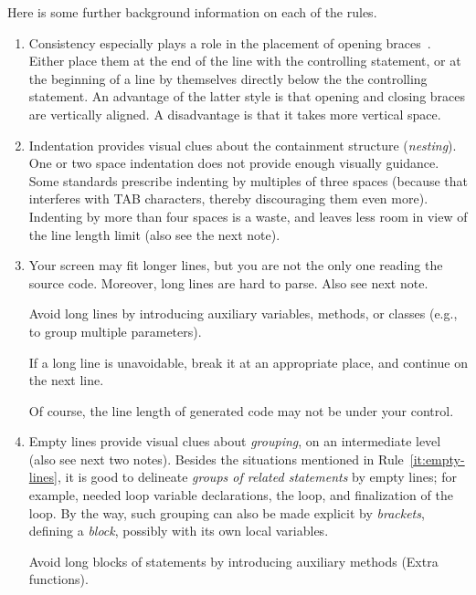 \documentclass[a4paper,11pt]{article}
\begin{document}
Here is some further background information on each of the rules.
\begin{enumerate}

\item Consistency especially plays a role
  in the placement of opening braces~\lstinline"".
  Either place them at the end of the line with the controlling statement,
  or at the beginning of a line by themselves directly below the the controlling statement.
  An advantage of the latter style is that opening and closing braces are vertically aligned.
  A disadvantage is that it takes more vertical space.

\item Indentation provides visual clues
  about the containment structure (\emph{nesting\/}).
  One or two space indentation does not provide enough visually guidance.
  Some standards prescribe indenting by multiples of three spaces
  (because that interferes with TAB characters, thereby discouraging them even more).
  Indenting by more than four spaces is a waste,
  and leaves less room in view of the line length limit
  (also see the next note).

\item Your screen may fit longer lines,
  but you are not the only one reading the source code.
  Moreover, long lines are hard to parse.
  Also see next note.
  
  Avoid long lines by introducing auxiliary variables, methods,
  or classes (e.g., to group multiple parameters).
  
  If a long line is unavoidable,
  break it at an appropriate place, and continue on the next line.
  
  Of course, the line length of generated code may not be under your control.

\item Empty lines provide visual clues about \emph{grouping},
  on an intermediate level (also see next two notes).
  Besides the situations mentioned in Rule~\ref{it:empty-lines},
  it is good to delineate \emph{groups of related statements\/} by empty lines;
  for example, needed loop variable declarations, the loop, and finalization of the loop.
  By the way,
  such grouping can also be made explicit by \emph{brackets},
  defining a \emph{block}, possibly with its own local variables.
  
  Avoid long blocks of statements by introducing auxiliary methods (Extra functions).


\end{enumerate}
\end{document}
